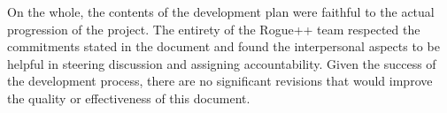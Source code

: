 \documentclass{article}
\newcommand{\rev}[1]{\textcolor{RevisionColour}{#1}}
\begin{document}
\rev{On the whole, the contents of the development plan were faithful to the actual progression of the project.  The entirety of the Rogue++ team respected the commitments stated in the document and found the interpersonal aspects to be helpful in steering discussion and assigning accountability.  Given the success of the development process, there are no significant revisions that would improve the quality or effectiveness of this document.}
\end{document}

